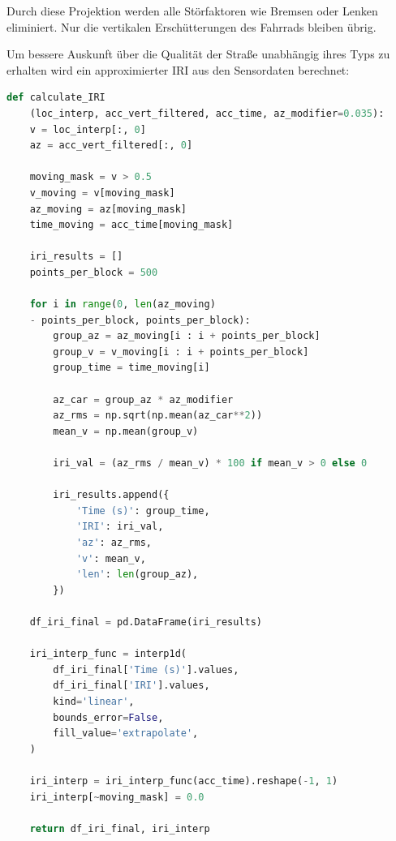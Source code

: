 Durch diese Projektion werden alle Störfaktoren wie Bremsen oder Lenken eliminiert. Nur die vertikalen Erschütterungen des Fahrrads bleiben übrig.

Um bessere Auskunft über die Qualität der Straße unabhängig ihres Typs zu erhalten wird ein approximierter IRI aus den Sensordaten berechnet:

\begin{lstlisting}[language=Python, caption={Berechnung und Interpolation des fahrradbasierten IRI.}, label={lst:calculate_iri}]
def calculate_IRI
    (loc_interp, acc_vert_filtered, acc_time, az_modifier=0.035):
    v = loc_interp[:, 0]
    az = acc_vert_filtered[:, 0]

    moving_mask = v > 0.5
    v_moving = v[moving_mask]
    az_moving = az[moving_mask]
    time_moving = acc_time[moving_mask]

    iri_results = []
    points_per_block = 500

    for i in range(0, len(az_moving) 
    - points_per_block, points_per_block):
        group_az = az_moving[i : i + points_per_block]
        group_v = v_moving[i : i + points_per_block]
        group_time = time_moving[i]

        az_car = group_az * az_modifier
        az_rms = np.sqrt(np.mean(az_car**2))
        mean_v = np.mean(group_v)

        iri_val = (az_rms / mean_v) * 100 if mean_v > 0 else 0

        iri_results.append({
            'Time (s)': group_time,
            'IRI': iri_val,
            'az': az_rms,
            'v': mean_v,
            'len': len(group_az),
        })

    df_iri_final = pd.DataFrame(iri_results)

    iri_interp_func = interp1d(
        df_iri_final['Time (s)'].values,
        df_iri_final['IRI'].values,
        kind='linear',
        bounds_error=False,
        fill_value='extrapolate',
    )

    iri_interp = iri_interp_func(acc_time).reshape(-1, 1)
    iri_interp[~moving_mask] = 0.0

    return df_iri_final, iri_interp
\end{lstlisting}

